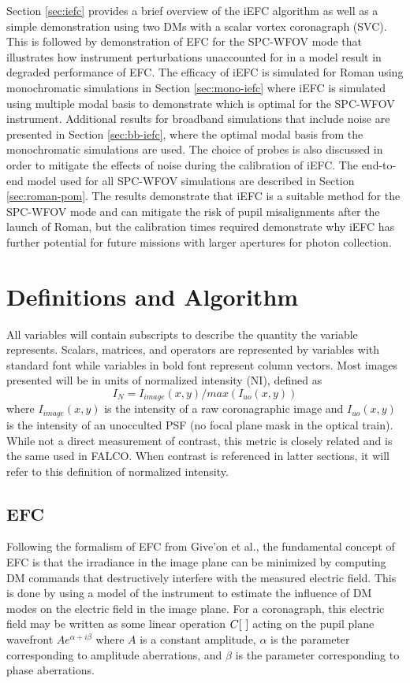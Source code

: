 \documentclass[12pt]{spieman}  %
\begin{document}
\begin{spacing}{2}
Section \ref{sec:iefc} provides a brief overview of the iEFC algorithm as well as a simple demonstration using two DMs with a scalar vortex coronagraph (SVC). This is followed by demonstration of EFC for the SPC-WFOV mode that illustrates how instrument perturbations unaccounted for in a model result in degraded performance of EFC. The efficacy of iEFC is simulated for Roman using monochromatic simulations in Section \ref{sec:mono-iefc} where iEFC is simulated using multiple modal basis to demonstrate which is optimal for the SPC-WFOV instrument. Additional results for broadband simulations that include noise are presented in Section \ref{sec:bb-iefc}, where the optimal modal basis from the monochromatic simulations are used. The choice of probes is also discussed in order to mitigate the effects of noise during the calibration of iEFC. The end-to-end model used for all SPC-WFOV simulations are described in Section \ref{sec:roman-pom}. The results demonstrate that iEFC is a suitable method for the SPC-WFOV mode and can mitigate the risk of pupil misalignments after the launch of Roman, but the calibration times required demonstrate why iEFC has further potential for future missions with larger apertures for photon collection. 

\section{Definitions and Algorithm}
\label{sec:defs}
All variables will contain subscripts to describe the quantity the variable represents. Scalars, matrices, and operators are represented by variables with standard font while variables in bold font represent column vectors. Most images presented will be in units of normalized intensity (NI), defined as $$I_N = I_{image}(x,y)/max(I_{uo}(x,y))$$ where $I_{image}(x,y)$ is the intensity of a raw coronagraphic image and $I_{uo}(x,y)$ is the intensity of an unocculted PSF (no focal plane mask in the optical train). While not a direct measurement of contrast, this metric is closely related and is the same used in FALCO\cite{sidick-falco-2}. When contrast is referenced in latter sections, it will refer to this definition of normalized intensity. 

\subsection{EFC}
\label{sec:efc}
Following the formalism of EFC from Give'on et al.\cite{give'on-bb-wavefront-correction}, the fundamental concept of EFC is that the irradiance in the image plane can be minimized by computing DM commands that destructively interfere with the measured electric field\cite{give'on-bb-wavefront-correction}. This is done by using a model of the instrument to estimate the influence of DM modes on the electric field in the image plane. For a coronagraph, this electric field may be written as some linear operation $C[\text{\space}]$ acting on the pupil plane wavefront $Ae^{\alpha + i\beta}$ where $A$ is a constant amplitude, $\alpha$ is the parameter corresponding to amplitude aberrations, and $\beta$ is the parameter corresponding to phase aberrations.


\end{spacing}
\end{document}
